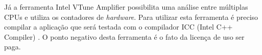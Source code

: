
Já a ferramenta Intel VTune Amplifier \cite{intelVtune} possibilita uma análise entre múltiplas CPUs e utiliza os contadores de \textit{hardware}. 
Para utilizar esta ferramenta é preciso compilar a aplicação que será testada com o compilador ICC (Intel C++ Compiler) \cite{icc}.
O ponto negativo desta ferramenta é o fato da licença de uso ser paga.






